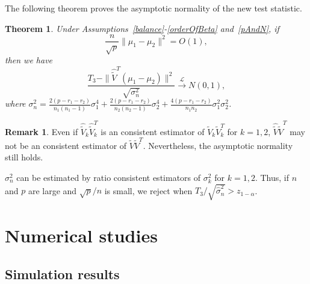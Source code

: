 \documentclass[review]{elsarticle}
\theoremstyle{plain}
\newtheorem{theorem}{\quad\quad Theorem}
\theoremstyle{definition}
\newtheorem{remark}{\quad\quad Remark}
\theoremstyle{remark}
\begin{document}
The following theorem proves the asymptotic normality of the new test statistic.


\begin{theorem}\label{myXiaopanpan}
    Under Assumptions~\ref{balance}-\ref{orderOfBeta} and~\ref{pAndN},
     if 
    $$\frac{n}{\sqrt{p}}\|\mu_1-\mu_2\|^2=O(1),$$
     then we have
\begin{equation*}
    \frac{T_3-\|\hat{\tilde{V}}^T(\mu_1-\mu_2)\|^2}{\sqrt{\sigma_n^2}}\xrightarrow{\mathcal{L}} N(0,1),
\end{equation*}
where
$\sigma_n^2=\frac{2(p-r_1-r_2)}{n_1(n_1-1)}\sigma_1^4+\frac{2(p-r_1-r_2)}{n_2(n_2-1)}\sigma_2^4+\frac{4(p-r_1-r_2)}{n_1n_2}\sigma_1^2\sigma_2^2$.
\end{theorem}
\begin{remark}
    Even if $\hat{\tilde{V}}_k\hat{\tilde{V}}_k^T$ is an consistent estimator of $\tilde{V}_k\tilde{V}_k^T$ for $k=1,2$, $\hat{\tilde{V}}\hat{\tilde{V}}^T$ may not be an consistent estimator of $\tilde{V}\tilde{V}^T$.
    Nevertheless, the asymptotic normality still holds.
\end{remark}

 $\sigma_n^2$ can be estimated by ratio consistent estimators of $\sigma^2_k$ for $k=1,2$. Thus, if $n$ and $p$ are large and ${\sqrt{p}}/{n}$ is small, we reject when $T_3/\sqrt{\hat{\sigma}_n^2}>z_{1-\alpha}$. 




\section{Numerical studies}
\subsection{Simulation results}
\end{document}

